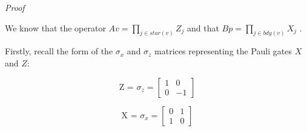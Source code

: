 \documentclass[12pt]{report}
\begin{document}
\begin{minipage}{1\textwidth}
		\textit{Proof}\newline
		
		We know that the operator $ Av = \prod_{j \in star(v)} Z_j $ and that $ Bp = \prod_{j \in bdy(v)} X_j $ .\newline
		
		Firstly, recall the form of the $\sigma_x$ and $\sigma_z$ matrices representing the Pauli gates $X$ and $Z$:
		
		
		
		\[
		\text{Z = $\sigma_z$} =
		\begin{bmatrix}
			1 & 0 \\
			0 & -1
		\end{bmatrix}
		\]
		
		
		\[
		\text{X = $\sigma_x$} =
		\begin{bmatrix}
			0 & 1 \\
			1 & 0
		\end{bmatrix}
		\]
		
		
	\end{minipage}  
	
\end{document}
